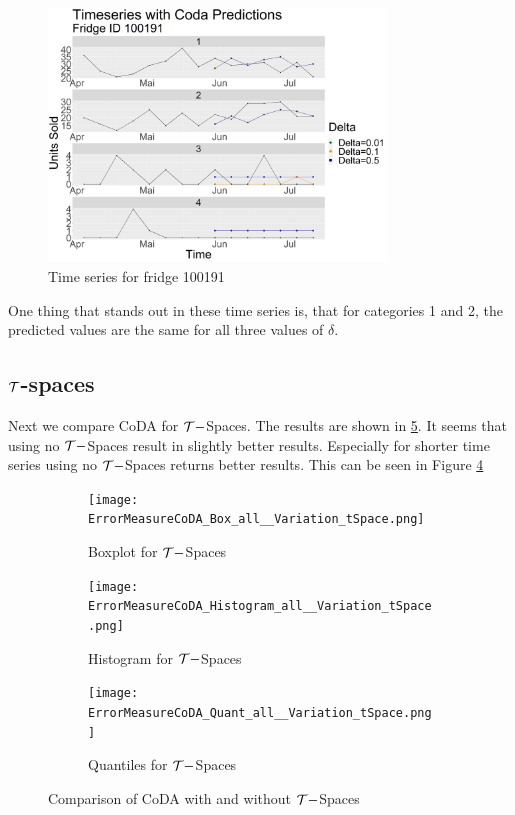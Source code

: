 \begin{figure}[htbp]
	\centering
		\includegraphics[width=0.80\textwidth]{Graphiken/Coda_Timeseries_VariationdL100191.png}
	\caption{Time series for fridge 100191}
	\label{fig:Coda_Timeseries_ID100191}
\end{figure}

One thing that stands out in these time series is, that for categories 1 and 2, the predicted values are the same for all three values of $\delta$. 

\subsection{$\mathcal{T}$-spaces}
\label{sec: Tspaces results}

Next we compare CoDA for $\mathcal{T}-$Spaces. The results are shown in \ref{fig:Coda T-Spaces Comp1}. It seems that using no $\mathcal{T}-$Spaces result in slightly better results. Especially for shorter time series using no $\mathcal{T}-$Spaces returns better results. This can be seen in Figure \ref{fig:Coda T-Spaces Quant}

\begin{figure}[htb!]
\centering
\begin{subfigure}[b]{0.45\textwidth}
\texttt{[image: ErrorMeasureCoDA\_Box\_all\_\_Variation\_tSpace.png]}
\caption{Boxplot for $\mathcal{T}-$Spaces}
\label{fig:Coda T-Spaces Box}
\end{subfigure}
\hfill
\begin{subfigure}[b]{0.45\textwidth}
\texttt{[image: ErrorMeasureCoDA\_Histogram\_all\_\_Variation\_tSpace.png]}
\caption{Histogram for $\mathcal{T}-$Spaces}
\label{fig:Coda T-Spaces Hist}
\end{subfigure}
\hfill
\begin{subfigure}[b]{0.8\textwidth}
\texttt{[image: ErrorMeasureCoDA\_Quant\_all\_\_Variation\_tSpace.png]}
\caption{Quantiles for $\mathcal{T}-$Spaces}
\label{fig:Coda T-Spaces Quant}
\end{subfigure}
\caption{Comparison of CoDA with and without $\mathcal{T}-$Spaces}
\label{fig:Coda T-Spaces Comp1}
\end{figure}


